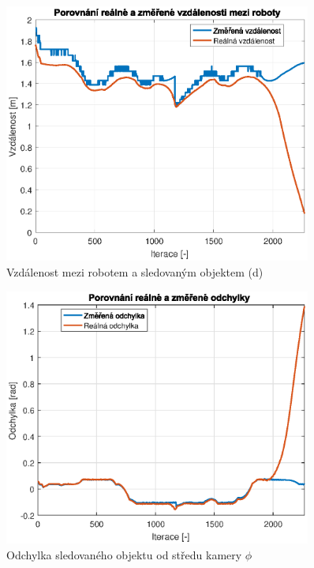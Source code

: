 \documentclass[twoside]{ctuthesis}
\theoremstyle{plain}
\theoremstyle{definition}
\theoremstyle{note}
\begin{document}
\begin{figure}
	\caption{Vzdálenost mezi robotem a sledovaným objektem (d)}
	
	\label{dist}
	\includegraphics[width=0.9\textwidth]{images/5/dist.eps}
\end{figure}

\begin{figure}
	\caption{Odchylka sledovaného objektu od středu kamery $\phi$}
	
	\label{odch}
	\includegraphics[width=0.9\textwidth]{images/5/odchylka.eps}
\end{figure}
\end{document}
